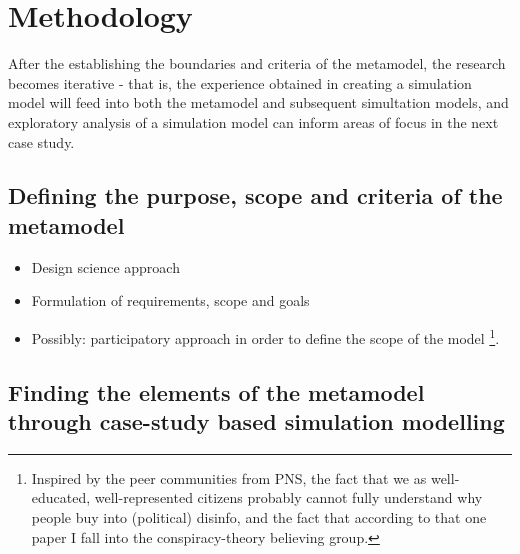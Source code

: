 \section{Methodology}
After the establishing the boundaries and criteria of the metamodel, the research becomes iterative - that is, the experience obtained in creating a simulation model will feed into both the metamodel and subsequent simultation models, and exploratory analysis of a simulation model can inform areas of focus in the next case study.


\subsection{Defining the purpose, scope and criteria of the metamodel}

\begin{itemize}
	\item Design science approach
	\item Formulation of requirements, scope and goals
	\item Possibly: participatory approach in order to define the scope of the model \footnote{Inspired by the peer communities from PNS, the fact that we as well-educated, well-represented citizens probably cannot fully understand why people buy into (political) disinfo, and the fact that according to that one paper I fall into the conspiracy-theory believing group.}. 
\end{itemize}

\subsection{Finding the elements of the metamodel through case-study based simulation modelling}
	
